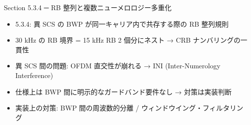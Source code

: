 \begin{frame}{Section 5.3.4 ─ RB 整列と複数ニューメロロジー多重化}
\begin{itemize}
  \item 5.3.4: 異 SCS の BWP が同一キャリア内で共存する際の RB 整列規則
  \item 30 kHz の RB 境界 = 15 kHz RB 2 個分にネスト → CRB ナンバリングの一貫性
  \item 異 SCS 間の問題: OFDM 直交性が崩れる → INI (Inter-Numerology Interference)
  \item 仕様上は BWP 間に明示的なガードバンド要件なし → 対策は実装判断
  \item 実装上の対策: BWP 間の周波数的分離 / ウィンドウイング・フィルタリング
\end{itemize}
\end{frame}
